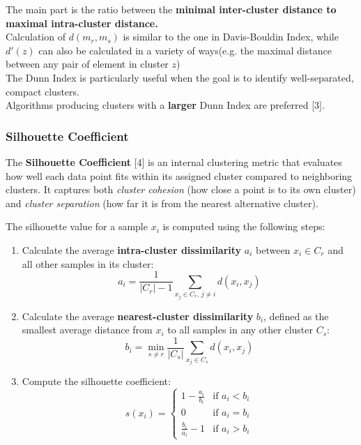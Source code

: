 \documentclass{article}
\renewcommand{\cite}[1]{[#1]}
\begin{document}
The main part is the ratio between the \textbf{minimal inter-cluster distance to maximal intra-cluster distance.}\\
Calculation of $d(m_r,m_s)$ is similar to the one in Davis-Bouldin Index, while $d'(z)$ can also be calculated in a variety of ways(e.g. the maximal distance between any pair of element in cluster $z$)\\
The Dunn Index is particularly useful when the goal is to identify well-separated, compact clusters.\\
Algorithms producing clusters with a \textbf{larger} Dunn Index are preferred \cite{3}.

\subsubsection{Silhouette Coefficient}

The \textbf{Silhouette Coefficient} \cite{4} is an internal clustering metric that evaluates how well each data point fits within its assigned cluster compared to neighboring clusters. It captures both \emph{cluster cohesion} (how close a point is to its own cluster) and \emph{cluster separation} (how far it is from the nearest alternative cluster).

The silhouette value for a sample $x_i$ is computed using the following steps:

\begin{enumerate}
    \item Calculate the average \textbf{intra-cluster dissimilarity} $a_i$ between $x_i \in C_r$ and all other samples in its cluster:
    \[
    a_i = \frac{1}{|C_r|-1}\sum_{x_j\in C_r,\, j\neq i} d(x_i,x_j)
    \]
    
    \item Calculate the average \textbf{nearest-cluster dissimilarity} $b_i$, defined as the smallest average distance from $x_i$ to all samples in any other cluster $C_s$:
    \[
    b_i = \min_{s\neq r}\frac{1}{|C_s|}\sum_{x_j \in C_s} d(x_i, x_j)
    \]
    
    \item Compute the silhouette coefficient:
    \[
    s(x_i)=\begin{cases}
            1-\frac{a_i}{b_i} & \text{if } a_i < b_i \\[6pt]
            0 & \text{if } a_i=b_i \\[6pt]
            \frac{b_i}{a_i}-1 & \text{if } a_i > b_i
            \end{cases}
    \]
\end{enumerate}
\end{document}
